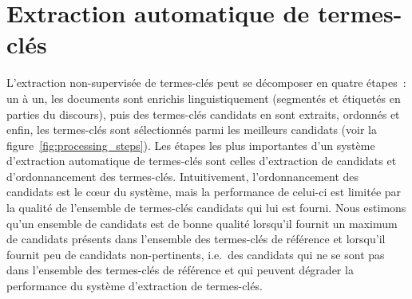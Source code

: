 \section{Extraction automatique de termes-clés}
\label{sec:extraction_automatique_de_termes_cles}
  L'extraction non-supervisée de termes-clés peut se décomposer en quatre
  étapes~: un à un, les documents sont enrichis linguistiquement (segmentés et
  étiquetés en parties du discours), puis des termes-clés candidats en sont
  extraits, ordonnés et enfin, les termes-clés sont sélectionnés parmi les
  meilleurs candidats (voir la figure~\ref{fig:processing_steps}). Les étapes
  les plus importantes d'un système d'extraction automatique de termes-clés sont
  celles d'extraction de candidats et d'ordonnancement des termes-clés.
  Intuitivement, l'ordonnancement des candidats est le c\oe{}ur du système, mais
  la performance de celui-ci est limitée par la qualité de l'ensemble de
  termes-clés candidats qui lui est fourni. Nous estimons qu'un ensemble de
  candidats est de bonne qualité lorsqu'il fournit un maximum de candidats
  présents dans l'ensemble des termes-clés de référence et lorsqu'il fournit peu
  de candidats non-pertinents, i.e.~des candidats qui ne se sont pas dans
  l'ensemble des termes-clés de référence et qui peuvent dégrader la performance
  du système d'extraction de termes-clés.
